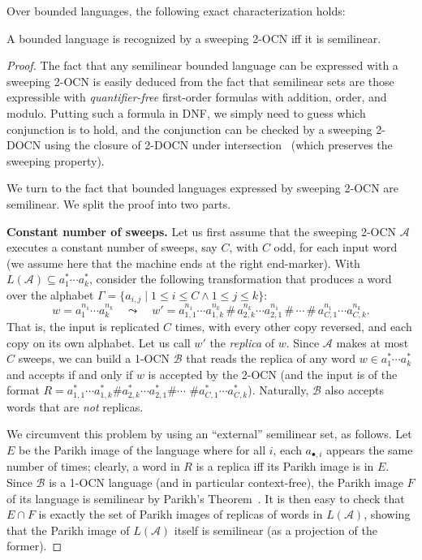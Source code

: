 \documentclass[USenglish]{lipics-v2021}
\newcommand{\cA}{\mathcal{A}}
\newcommand{\cB}{\mathcal{B}}
\newcommand{\mysubparagraph}[1]{\noindent \textbf{\textsf{#1}} }
\begin{document}
Over bounded languages, the following exact characterization holds:
\begin{theorem}
	\label{thm:bounded_sweeping_equiv_semilinear} A bounded language is recognized by a sweeping
	2-OCN iff it is semilinear.
\end{theorem}
\begin{proof}
	The fact that any semilinear bounded language can be expressed with a sweeping
	2-OCN is easily deduced from the fact that semilinear sets are those
	expressible with \emph{quantifier-free} first-order formulas with addition,
	order, and modulo.  Putting such a formula in DNF, we simply need to guess
	which conjunction is to hold, and the conjunction can be checked by a sweeping
	2-DOCN using the closure of 2-DOCN under intersection~\cite{miyano1982two} (which preserves the sweeping property).
	
	We turn to the fact that bounded languages expressed by sweeping 2-OCN are
	semilinear.  We split the proof into two parts.
	
	\mysubparagraph{Constant number of sweeps.}  Let us first assume that the
	sweeping 2-OCN \(\cA\) executes a constant number of sweeps, say \(C\), with
	\(C\) odd, for each input word (we assume here that the machine ends at the
	right end-marker).  With \(L(\cA) \subseteq a_1^*\cdots a_k^*\), consider the following
	transformation that produces a word over the alphabet
	\(\Gamma = \{a_{i,j} \mid 1 \leq i \leq C \land 1 \leq j \leq k\}\):
	\[w = a_1^{n_1}\cdots a_k^{n_k} \quad \leadsto \quad w' = a_{1,1}^{n_1}\cdots a_{1,k}^{n_k} \,\#\,
	a_{2,k}^{n_k}\cdots a_{2,1}^{n_1} \,\#\, \cdots \,\#\, a_{C,1}^{n_1}\cdots
	a_{C,k}^{n_k}.\]%
	That is, the input is replicated \(C\) times, with every other copy reversed,
	and each copy on its own alphabet.  Let us call \(w'\) the \emph{replica} of
	\(w\).  Since \(\cA\) makes at most \(C\) sweeps, we can build a 1-OCN \(\cB\) that
	reads the replica of any word \(w \in a_1^*\cdots a_k^*\) and accepts if and only if
	\(w\) is accepted by the 2-OCN (and the input is of the format \(R =
	a_{1,1}^*\cdots a_{1,k}^*\#a_{2,k}^*\cdots a_{2,1}^*\#\cdots\) \(\# a_{C,1}^*\cdots a_{C,k}^*\)). 
	Naturally, \(\cB\) also accepts words that are
	\emph{not} replicas. 
	
	We circumvent this problem by using an ``external'' semilinear set, as follows. Let
	\(E\) be the Parikh image of the language where for all \(i\), each \(a_{\bullet,i}\)
	appears the same number of times; clearly, a word in \(R\) is a replica iff its
	Parikh image is in \(E\).  Since \(\cB\) is a 1-OCN language (and in particular context-free), the Parikh image \(F\)
	of its language is semilinear by Parikh's Theorem~\cite{parikh66}.  
	It is then easy to check that \(E \cap F\) is exactly
	the set of Parikh images of replicas of words in \(L(\cA)\), showing that the
	Parikh image of \(L(\cA)\) itself is semilinear (as a projection of the former).
	

\end{proof}
\end{document}
